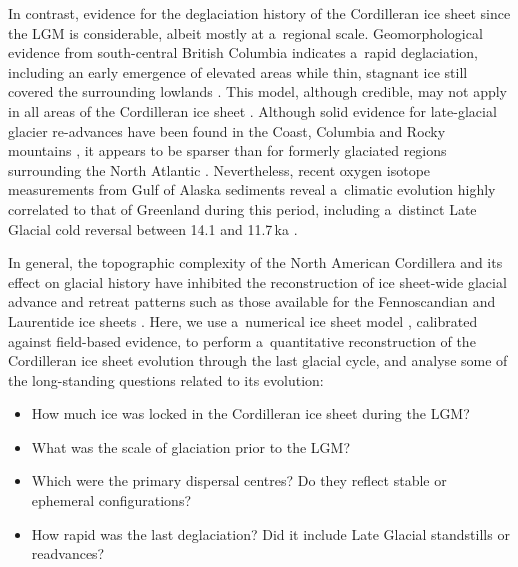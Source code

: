 \documentclass[tc, manuscript]{copernicus}
\begin{document}
      In contrast, evidence for the deglaciation history of the Cordilleran
      ice sheet since the LGM is considerable, albeit mostly at a~regional
      scale. Geomorphological evidence from south-central British Columbia
      indicates a~rapid deglaciation, including an early emergence of
      elevated areas while thin, stagnant ice still covered the surrounding
      lowlands \citep{Fulton.1967, Fulton.1991, Margold.etal.2011,
      Margold.etal.2013a}. This model, although credible, may not apply in
      all areas of the Cordilleran ice sheet \citep{Margold.etal.2013}.
      Although solid evidence for late-glacial glacier re-advances have been
      found in the Coast, Columbia and Rocky mountains
      \citep{Clague.etal.1997, Friele.Clague.2002, Friele.Clague.2002a,
      Kovanen.2002, Kovanen.Easterbrook.2002, Lakeman.etal.2008,
      Menounos.etal.2008}, it appears to be sparser than for formerly
      glaciated regions surrounding the North Atlantic
      \citep[e.g.,][]{Sissons.1979, Lundqvist.1987, Ivy-Ochs.etal.1999,
      Stea.etal.2011}. Nevertheless, recent oxygen isotope measurements from
      Gulf of Alaska sediments reveal a~climatic evolution highly correlated
      to that of Greenland during this period, including a~distinct Late
      Glacial cold reversal between 14.1 and 11.7\,\unit{ka}
      \citep{Praetorius.Mix.2014}.

      In general, the topographic complexity of the North American
      Cordillera and its effect on glacial history have inhibited the
      reconstruction of ice sheet-wide glacial advance and retreat patterns
      such as those available for the Fennoscandian and Laurentide ice
      sheets \citep{Boulton.etal.2001, Dyke.Prest.1987, Dyke.etal.2003,
      Kleman.etal.1997, Kleman.etal.2010, Stroeven.etal.inreview}. Here, we
      use a~numerical ice sheet model \citep{PISM-authors.2015}, calibrated
      against field-based evidence, to perform a~quantitative reconstruction
      of the Cordilleran ice sheet evolution through the last glacial cycle,
      and analyse some of the long-standing questions related to its
      evolution:

\begin{itemize}
  \item How much ice was locked in the Cordilleran ice sheet during the LGM?
  \item What was the scale of glaciation prior to the LGM?
  \item Which were the primary dispersal centres? Do they reflect stable or
    ephemeral configurations?
  \item How rapid was the last deglaciation? Did it include Late Glacial
    standstills or readvances?
\end{itemize}
\end{document}

